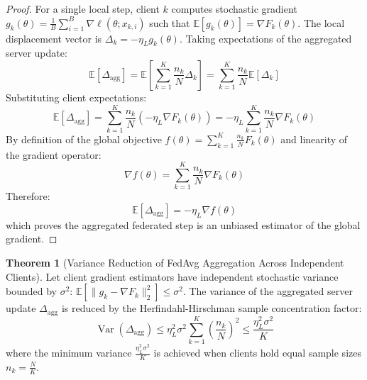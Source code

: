 \documentclass[11pt,a4paper]{article}
\theoremstyle{definition}
\newtheorem{theorem}{\textbf{Theorem}}[section]
\begin{document}
\begin{proof}
For a single local step, client $k$ computes stochastic gradient $g_k(\theta) = \frac{1}{B} \sum_{i=1}^B \nabla \ell(\theta; x_{k, i})$ such that $\mathbb{E}[g_k(\theta)] = \nabla F_k(\theta)$.
The local displacement vector is $\Delta_k = -\eta_L g_k(\theta)$.
Taking expectations of the aggregated server update:
\begin{equation}
\mathbb{E}\left[ \Delta_{\text{agg}} \right] = \mathbb{E}\left[ \sum_{k=1}^K \frac{n_k}{N} \Delta_k \right] = \sum_{k=1}^K \frac{n_k}{N} \mathbb{E}[\Delta_k]
\end{equation}
Substituting client expectations:
\begin{equation}
\mathbb{E}\left[ \Delta_{\text{agg}} \right] = \sum_{k=1}^K \frac{n_k}{N} \left(-\eta_L \nabla F_k(\theta)\right) = -\eta_L \sum_{k=1}^K \frac{n_k}{N} \nabla F_k(\theta)
\end{equation}
By definition of the global objective $f(\theta) = \sum_{k=1}^K \frac{n_k}{N} F_k(\theta)$ and linearity of the gradient operator:
\begin{equation}
\nabla f(\theta) = \sum_{k=1}^K \frac{n_k}{N} \nabla F_k(\theta)
\end{equation}
Therefore:
\begin{equation}
\mathbb{E}\left[ \Delta_{\text{agg}} \right] = -\eta_L \nabla f(\theta)
\end{equation}
which proves the aggregated federated step is an unbiased estimator of the global gradient.
\end{proof}

\begin{theorem}[Variance Reduction of FedAvg Aggregation Across Independent Clients]
Let client gradient estimators have independent stochastic variance bounded by $\sigma^2$: $\mathbb{E}[\|g_k - \nabla F_k\|_2^2] \le \sigma^2$. The variance of the aggregated server update $\Delta_{\text{agg}}$ is reduced by the Herfindahl-Hirschman sample concentration factor:
{\boldmath
\begin{equation}
\operatorname{Var}\left( \Delta_{\text{agg}} \right) \le \eta_L^2 \sigma^2 \sum_{k=1}^K \left( \frac{n_k}{N} \right)^2 \le \frac{\eta_L^2 \sigma^2}{K}
\end{equation}
}
where the minimum variance $\frac{\eta_L^2 \sigma^2}{K}$ is achieved when clients hold equal sample sizes $n_k = \frac{N}{K}$.
\end{theorem}
\end{document}
